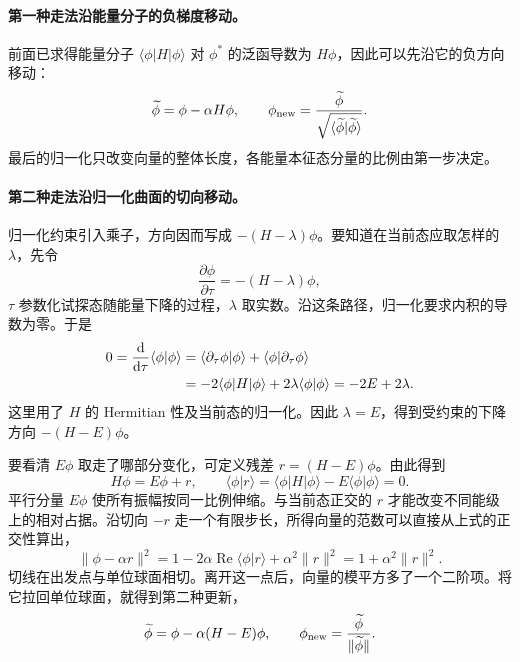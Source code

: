\paragraph{第一种走法沿能量分子的负梯度移动。}
前面已求得能量分子 $\langle\phi|H|\phi\rangle$ 对 $\phi^*$ 的泛函导数为 $H\phi$，因此可以先沿它的负方向移动：
\begin{equation}\label{hf:raw-gradient-step}
\widetilde\phi=\phi-\alpha H\phi,
\qquad
\phi_{\rm new}=\frac{\widetilde\phi}{\sqrt{\langle\widetilde\phi|\widetilde\phi\rangle}}.
\end{equation}
最后的归一化只改变向量的整体长度，各能量本征态分量的比例由第一步决定。

\paragraph{第二种走法沿归一化曲面的切向移动。}
归一化约束引入乘子，方向因而写成 $-(H-\lambda)\phi$。要知道在当前态应取怎样的 $\lambda$，先令
\begin{equation}
\frac{\partial\phi}{\partial\tau}=-(H-\lambda)\phi,
\end{equation}
$\tau$ 参数化试探态随能量下降的过程，$\lambda$ 取实数。沿这条路径，归一化要求内积的导数为零。于是
\begin{align}
0=\frac{\mathrm{d}}{\mathrm{d}\tau}\langle\phi|\phi\rangle
&=\langle\partial_\tau\phi|\phi\rangle+\langle\phi|\partial_\tau\phi\rangle\notag\\
&=-2\langle\phi|H|\phi\rangle+2\lambda\langle\phi|\phi\rangle
=-2E+2\lambda.
\end{align}
这里用了 $H$ 的 Hermitian 性及当前态的归一化。因此 $\lambda=E$，得到受约束的下降方向 $-(H-E)\phi$。

要看清 $E\phi$ 取走了哪部分变化，可定义残差 $r=(H-E)\phi$。由此得到
\begin{equation}\label{hf:projected-gradient}
H\phi=E\phi+r,\qquad
\langle\phi|r\rangle=\langle\phi|H|\phi\rangle-E\langle\phi|\phi\rangle=0.
\end{equation}
平行分量 $E\phi$ 使所有振幅按同一比例伸缩。与当前态正交的 $r$ 才能改变不同能级上的相对占据。沿切向 $-r$ 走一个有限步长，所得向量的范数可以直接从上式的正交性算出，
\begin{equation}
\|\phi-\alpha r\|^2
=1-2\alpha\operatorname{Re}\langle\phi|r\rangle+\alpha^2\|r\|^2
=1+\alpha^2\|r\|^2.
\end{equation}
切线在出发点与单位球面相切。离开这一点后，向量的模平方多了一个二阶项。将它拉回单位球面，就得到第二种更新，
\begin{equation}\label{hf:projected-gradient-step}
\widetilde\phi=\phi-\alpha(H-E)\phi,\qquad
\phi_{\rm new}=\frac{\widetilde\phi}{\|\widetilde\phi\|}.
\end{equation}

